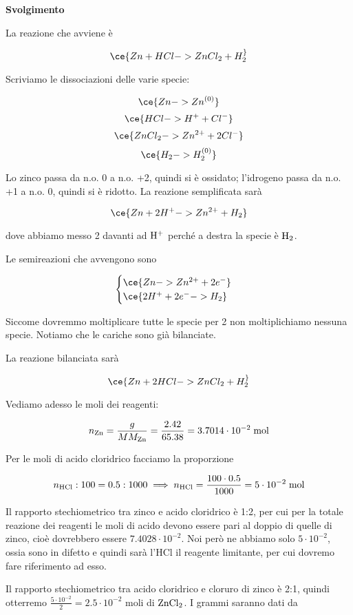 \vspace{0.2cm}\large\textbf{Svolgimento}\normalsize

\vspace{0.2cm}La reazione che avviene è

$$\ce{Zn + HCl -> ZnCl_2 + H_2 ^}$$

Scriviamo le dissociazioni delle varie specie:

$$\ce{Zn -> Zn^{(0)}}$$
$$\ce{HCl -> H^+ + Cl^-}$$
$$\ce{ZnCl_2 -> Zn^{2+} + 2Cl^-}$$
$$\ce{H_2 -> H_2^{(0)}}$$

Lo zinco passa da n.o. 0 a n.o. +2, quindi si è ossidato; l'idrogeno passa da n.o. +1 a n.o. 0, quindi si è ridotto. La reazione semplificata sarà

$$\ce{Zn + 2H^+ -> Zn^{2+} + H_2}$$

dove abbiamo messo 2 davanti ad $\rm H^+$ perché a destra la specie è $\rm H_2$.

Le semireazioni che avvengono sono

$$\begin{cases}
    \ce{Zn -> Zn^{2+} + 2e^-}\\
    \ce{2H^{+} + 2e^- -> H_2}
\end{cases}$$

Siccome dovremmo moltiplicare tutte le specie per 2 non moltiplichiamo nessuna specie. Notiamo che le cariche sono già bilanciate.

La reazione bilanciata sarà

$$\ce{Zn + 2HCl -> ZnCl_2 + H_2 ^}$$

Vediamo adesso le moli dei reagenti:

$$n_{\rm Zn}=\frac{g}{MM_{\rm Zn}}=\frac{2.42}{65.38}=3.7014 \cdot 10^{-2} \; \rm mol$$

Per le moli di acido cloridrico facciamo la proporzione

$$n_{\rm HCl}:100=0.5:1000
\implies
n_{\rm HCl}=\frac{100 \cdot 0.5}{1000}=5 \cdot 10^{-2} \; \rm mol$$

Il rapporto stechiometrico tra zinco e acido cloridrico è 1:2, per cui per la totale reazione dei reagenti le moli di acido devono essere pari al doppio di quelle di zinco, cioè dovrebbero essere $7.4028 \cdot 10^{-2}$. Noi però ne abbiamo solo $5 \cdot 10^{-2}$, ossia sono in difetto e quindi sarà l'HCl il reagente limitante, per cui dovremo fare riferimento ad esso.

Il rapporto stechiometrico tra acido cloridrico e cloruro di zinco è 2:1, quindi otterremo $\frac{5\cdot 10^{-2}}{2}=2.5 \cdot 10^{-2}$ moli di $\rm ZnCl_2$. I grammi saranno dati da

